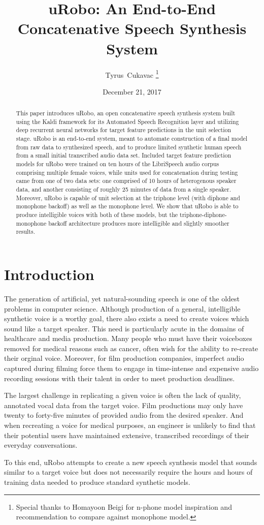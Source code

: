 \documentclass[10pt, journal, compsoc]{IEEEtran}
\author{Tyrus~Cukavac%
\thanks{Special thanks to Homayoon Beigi for n-phone model inspiration and recommendation to compare against monophone model.}}
\title{uRobo: An End-to-End Concatenative Speech Synthesis System}
\date{December 21, 2017}
\begin{document}
\maketitle
\begin{abstract}
This paper introduces uRobo, an open concatenative speech synthesis system built using the Kaldi framework for its Automated Speech Recognition layer and utilizing deep recurrent neural networks for target feature predictions in the unit selection stage. uRobo is an end-to-end system, meant to automate construction of a final model from raw data to synthesized speech, and to produce limited synthetic human speech from a small initial transcribed audio data set. Included target feature prediction models for uRobo were trained on ten hours of the LibriSpeech audio corpus comprising multiple female voices, while units used for concatenation during testing came from one of two data sets: one comprised of 10 hours of heterogenous speaker data, and another consisting of roughly 25 minutes of data from a single speaker. Moreover, uRobo is capable of unit selection at the triphone level (with diphone and monophone backoff) as well as the monophone level. We show that uRobo is able to produce intelligible voices with both of these models, but the triphone-diphone-monophone backoff architecture produces more intelligible and slightly smoother results.
\end{abstract}
\section{Introduction}
The generation of artificial, yet natural-sounding speech is one of the oldest problems in computer science. Although production of a general, intelligible synthetic voice is a worthy goal, there also exists a need to create voices which sound like a target speaker. This need is particularly acute in the domains of healthcare and media production. Many people who must have their voiceboxes removed for medical reasons such as cancer, often wish for the ability to re-create their orginal voice. Moreover, for film production companies, imperfect audio captured during filming force them to engage in time-intense and expensive audio recording sessions with their talent in order to meet production deadlines.\par
The largest challenge in replicating a given voice is often the lack of quality, annotated vocal data from the target voice. Film productions may only have twenty to forty-five minutes of provided audio from the desired speaker. And when recreating a voice for medical purposes, an engineer is unlikely to find that their potential users have maintained extensive, transcribed recordings of their everyday conversations.\par
To this end, uRobo attempts to create a new speech synthesis model that sounds similar to a target voice but does not necessarily require the hours and hours of training data needed to produce standard synthetic models.
\end{document}
